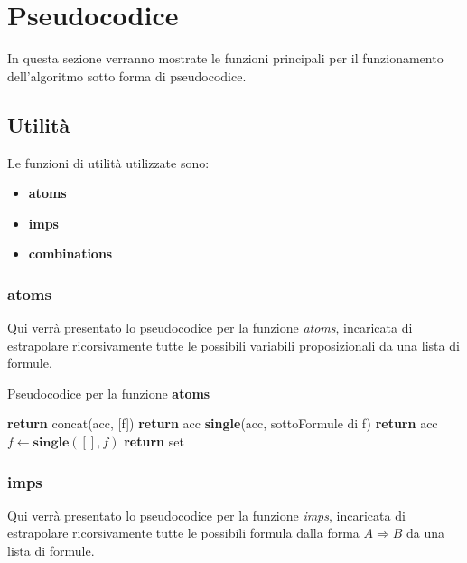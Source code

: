 \documentclass[\main/tesi.tex]{subfiles}
\begin{document}
\chapter{Pseudocodice}

In questa sezione verranno mostrate le funzioni principali per il funzionamento dell'algoritmo sotto forma di pseudocodice.

\section{Utilità}

Le funzioni di utilità utilizzate sono:
\begin{itemize}
    \item \textbf{atoms}
    \item \textbf{imps}
    \item \textbf{combinations}
\end{itemize}

\subsection{atoms}
Qui verrà presentato lo pseudocodice per la funzione \textit{atoms}, incaricata di estrapolare ricorsivamente tutte le possibili variabili proposizionali da una lista di formule. \\

\begin{algorithm}
    \caption{Pseudocodice per la funzione \textbf{atoms}}\label{alg:atoms}
    \begin{algorithmic}
        \State \textbf{return} concat(acc, [f])
        \State \textbf{return} acc
        \Else
        \State \textbf{single}(acc, sottoFormule di f)
        \EndIf
        \State \textbf{return} acc
        \EndFunction
        \State $f \gets \textbf{single}([], f)$
        \EndFor
        \State \textbf{return} set
        \EndFunction
    \end{algorithmic}
\end{algorithm}

\subsection{imps}
Qui verrà presentato lo pseudocodice per la funzione \textit{imps}, incaricata di estrapolare ricorsivamente tutte le possibili formula dalla forma $A \Rightarrow B$ da una lista di formule. \\
\end{document}
